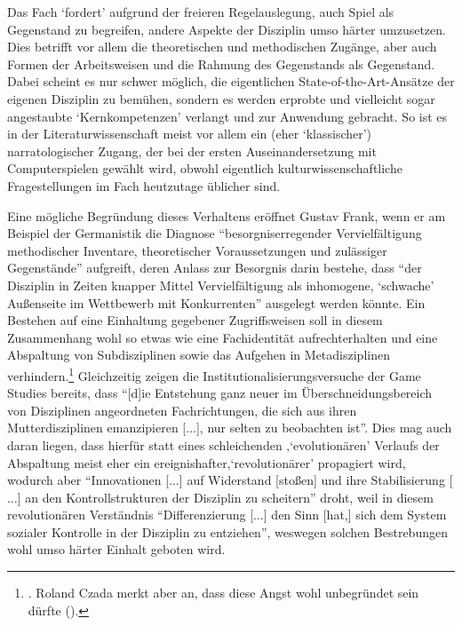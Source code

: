 \documentclass{scrartcl}
\begin{document}
Das Fach \enquote*{fordert} aufgrund der freieren Regelauslegung, auch Spiel als Gegenstand zu begreifen, andere Aspekte der Disziplin umso härter umzusetzen.
Dies betrifft vor allem die theoretischen und methodischen Zugänge, aber auch Formen der Arbeitsweisen und die Rahmung des Gegenstands als Gegenstand.
Dabei scheint es nur schwer möglich, die eigentlichen State-of-the-Art-Ansätze der eigenen Disziplin zu bemühen, sondern es werden erprobte und vielleicht sogar angestaubte \enquote*{Kernkompetenzen} verlangt und zur Anwendung gebracht.
So ist es in der Literaturwissenschaft meist vor allem ein (eher \enquote*{klassischer}) narratologischer Zugang, der bei der ersten Auseinandersetzung mit Computerspielen gewählt wird, obwohl eigentlich kulturwissenschaftliche Fragestellungen im Fach heutzutage üblicher sind.

Eine mögliche Begründung dieses Verhaltens eröffnet Gustav Frank, wenn er am Beispiel der Germanistik die Diagnose \enquote{besorgniserregender Vervielfältigung methodischer Inventare, theoretischer Voraussetzungen und zulässiger Gegenstände} aufgreift, deren Anlass zur Besorgnis darin bestehe, dass \enquote{der Disziplin in Zeiten knapper Mittel Vervielfältigung als inhomogene, \enquote{schwache} Außenseite im Wettbewerb mit Konkurrenten} ausgelegt werden könnte.\autocite[][S.~61]{frank_problemlosen_2000}
Ein Bestehen auf eine Einhaltung gegebener Zugriffsweisen soll in diesem Zusammenhang wohl so etwas wie eine Fachidentität aufrechterhalten und eine Abspaltung von Subdisziplinen sowie das Aufgehen in Metadisziplinen verhindern.\footnote{\autocite[Vgl.][S.~76]{frank_problemlosen_2000}. Roland Czada merkt aber an, dass diese Angst wohl unbegründet sein dürfte (\autocite[vgl.][S.~39]{czada_disziplinare_2002}).}
Gleichzeitig zeigen die Institutionalisierungsversuche der Game Studies bereits, dass \enquote{[d]ie Entstehung ganz neuer im Überschneidungsbereich von Disziplinen angeordneten Fachrichtungen, die sich aus ihren Mutterdisziplinen emanzipieren [$\ldots$], nur selten zu beobachten ist}.\autocite[][S.~26]{czada_disziplinare_2002}
Dies mag auch daran liegen, dass hierfür statt eines schleichenden ‚\enquote*{evolutionären} Verlaufs der Abspaltung meist eher ein ereignishafter‚\enquote*{revolutionärer} propagiert wird,\autocite[Vgl.][S.~37--38]{stichweh_wissenschaft_2013} wodurch aber \enquote{Innovationen [$\ldots$] auf Widerstand [stoßen] und ihre Stabilisierung [$\ldots$] an den Kontrollstrukturen der Disziplin zu scheitern} droht, weil in diesem revolutionären Verständnis \enquote{Differenzierung [$\ldots$] den Sinn [hat,] sich dem System sozialer Kontrolle in der Disziplin zu entziehen},\autocite[][S.~38]{stichweh_wissenschaft_2013} weswegen solchen Bestrebungen wohl umso härter Einhalt geboten wird.
\end{document}
